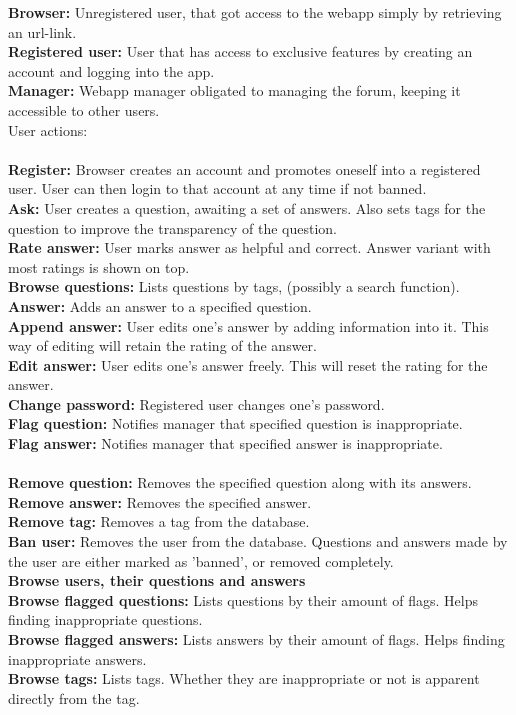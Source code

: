\documentclass[a4paper,12pt]{article}
\begin{document}
\noindent \textbf{Browser:} Unregistered user, that got access to the webapp simply by retrieving an url-link.\\
\textbf{Registered user:} User that has access to exclusive features by creating an account and logging into the app.\\
\textbf{Manager:} Webapp manager obligated to managing the forum, keeping it accessible to other users.\\

\noindent User actions:\\
\\
\textbf{Register:} Browser creates an account and promotes oneself into a registered user. User can then login to that account at any time if not banned.\\
\textbf{Ask:} User creates a question, awaiting a set of answers. Also sets tags for the question to improve the transparency of the question.\\
\textbf{Rate answer:} User marks answer as helpful and correct. Answer variant with most ratings is shown on top.\\
\textbf{Browse questions:} Lists questions by tags, (possibly a search function).\\
\textbf{Answer:} Adds an answer to a specified question.\\
\textbf{Append answer:} User edits one's answer by adding information into it. This way of editing will retain the rating of the answer.\\
\textbf{Edit answer:} User edits one's answer freely. This will reset the rating for the answer.\\
\textbf{Change password:} Registered user changes one's password.\\
\textbf{Flag question:} Notifies manager that specified question is inappropriate.\\
\textbf{Flag answer:} Notifies manager that specified answer is inappropriate.\\
\\
\textbf{Remove question:} Removes the specified question along with its answers.\\
\textbf{Remove answer:} Removes the specified answer.\\
\textbf{Remove tag:} Removes a tag from the database.\\
\textbf{Ban user:} Removes the user from the database. Questions and answers made by the user are either marked as 'banned', or removed completely.\\
\textbf{Browse users, their questions and answers}\\
\textbf{Browse flagged questions:} Lists questions by their amount of flags. Helps finding inappropriate questions.\\
\textbf{Browse flagged answers:} Lists answers by their amount of flags. Helps finding inappropriate answers.\\
\textbf{Browse tags:} Lists tags. Whether they are inappropriate or not is apparent directly from the tag.\\
\end{document}
